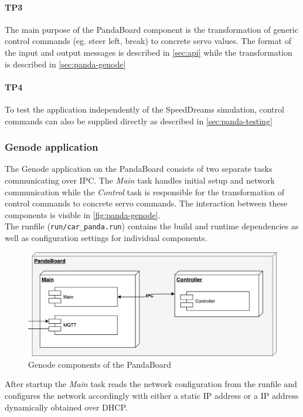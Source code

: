 \paragraph{\textbf{TP3}} The main purpose of the PandaBoard component is the transformation of generic control commands (eg. steer left, break) to concrete servo values. The format of the input and output messages is described in \autoref{sec:api} while the transformation is described in \autoref{sec:panda-genode}

\paragraph{\textbf{TP4}} To test the application independently of the SpeedDreams simulation, control commands can also be supplied directly as described in \autoref{sec:panda-testing}


\subsubsection{Genode application}
\label{sec:panda-genode}
The Genode application on the PandaBoard consists of two separate tasks communicating over IPC. The \textit{Main} task handles initial setup and network communication while the \textit{Control} task is responsible for the transformation of control commands to concrete servo commands. The interaction between these components is visible in \autoref{fig:panda-genode}. \\

The runfile (\texttt{run/car\_panda.run}) contains the build and runtime dependencies as well as configuration settings for individual components.

\begin{figure}[h]
    \centering
    \includegraphics[width=0.7\linewidth]{images/comp_panda}
    \caption{Genode components of the PandaBoard}
    \label{fig:panda-genode}
\end{figure}

After startup the \textit{Main} task reads the network configuration from the runfile and configures the network accordingly with either a static IP address or a IP address dynamically obtained over DHCP.

